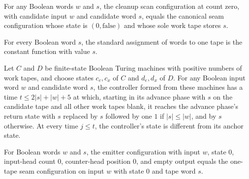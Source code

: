 \begin{lemma}
\label{Turing.FinTM.emitterP2_advance_initial}
\leanok
{}
For any Boolean words $w$ and $s$, the cleanup scan configuration at count zero, with
candidate input $w$ and candidate word $s$, equals the canonical seam configuration
whose state is $(0,\mathrm{false})$ and whose sole work tape stores $s$.
\end{lemma}

\begin{lemma}
\label{Turing.FinTM.emitterP2_stateWord_one}
\leanok
{}
For every Boolean word $s$, the standard assignment of words to one tape is the constant
function with value $s$.
\end{lemma}

\begin{lemma}
\label{Turing.FinTM.emitterP2_body_advance}
\leanok
{}
Let $C$ and $D$ be finite-state Boolean Turing machines with positive numbers of work
tapes, and choose states $c_e,c_x$ of $C$ and $d_e,d_x$ of $D$. For any Boolean input
word $w$ and candidate word $s$, the controller formed from these machines has a time
$t\le 2|s|+|w|+5$ at which, starting in its advance phase with $s$ on the candidate tape
and all other work tapes blank, it reaches the advance phase's return state with $s$
replaced by $s$ followed by one $1$ if $|s|\le |w|$, and by $s$ otherwise. At every time
$j\le t$, the controller's state is different from its anchor state.
\end{lemma}

\begin{lemma}
\label{Turing.FinTM.emitterP2_emit_initial}
\leanok
{}
For Boolean words $w$ and $s$, the emitter configuration with input $w$, state $0$,
input-head count $0$, counter-head position $0$, and empty output equals the one-tape
seam configuration on input $w$ with state $0$ and tape word $s$.
\end{lemma}

